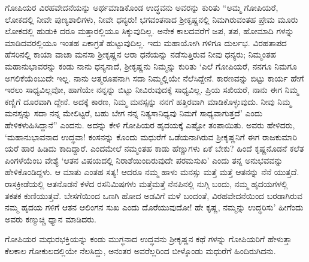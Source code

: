 ಗೋಪಿಯರ ವಿರಹವೇದನೆಯನ್ನು ಅರ್ಥಮಾಡಿಕೊಂಡ ಉದ್ಧವನು ಅವರನ್ನು ಕುರಿತು “ಅಮ್ಮ ಗೋಪಿಯರೆ, ಲೋಕದಲ್ಲಿ ನೀವೇ ಪುಣ್ಯಶಾಲಿಗಳು, ನೀವೇ ಧನ್ಯರು! ಭಗವಂತನಾದ ಶ್ರೀಕೃಷ್ಣನಲ್ಲಿ ನಿಮಗಿರುವಂತಹ ಪ್ರೇಮ ಮೂರು ಲೋಕದಲ್ಲಿ ಹುಡುಕಿ ದರೂ ಮತ್ತಾರಲ್ಲಿಯೂ ಸಿಕ್ಕುವುದಿಲ್ಲ. ಅನೇಕ ಕಾಲದವರೆಗೆ ಜಪ, ತಪ, ಹೋಮಾದಿ ಗಳನ್ನು ಮಾಡಿದವರಲ್ಲಿಯೂ ಇಂತಹ ಏಕಾಗ್ರತೆ ಹುಟ್ಟುವುದಿಲ್ಲ. ಇದು ಮಹಾಯೋಗಿ ಗಳಿಗೂ ದುರ್ಲಭ. ವಿರಹತಾಪದ ಹೆಸರಿನಲ್ಲಿ ಕಾಯಾ ವಾಚಾ ಮನಸಾ ಶ್ರೀಕೃಷ್ಣನ ಆರಾ ಧನೆಯನ್ನು ನಡೆಸುತ್ತಿರುವ ನೀವು ಧನ್ಯರು; ನಿಮ್ಮಂತಹ ಮಹಾನುಭಾವರನ್ನು ಕಂಡು ನಾನು ಧನ್ಯನಾದೆ, ಶ್ರೀಕೃಷ್ಣನು ನಿಮ್ಮನ್ನು ಕುರಿತು ‘ಎಲೆ ಗೋಪಿಯರೆ, ನನಗೂ ನಿಮಗೂ ಅಗಲಿಕೆಯೆಂಬುದೇ ಇಲ್ಲ. ನಾನು ಆತ್ಮರೂಪನಾಗಿ ಸದಾ ನಿಮ್ಮಲ್ಲಿಯೇ ನೆಲೆಸಿದ್ದೇನೆ. ಕಾರಣವನ್ನು ಬಿಟ್ಟು ಕಾರ್ಯ ಹೇಗೆ ಇರಲು ಸಾಧ್ಯವಿಲ್ಲವೋ, ಹಾಗೆಯೇ ನನ್ನನ್ನು ಬಿಟ್ಟು ನೀವಿರುವುದಕ್ಕೆ ಸಾಧ್ಯವಿಲ್ಲ. ಪ್ರಿಯ ಸಖಿಯರೆ, ನಾನು ಈಗ ನಿಮ್ಮ ಕಣ್ಣಿಗೆ ದೂರವಾಗಿ ದ್ದೇನೆ. ಅದಕ್ಕೆ ಕಾರಣ, ನಿಮ್ಮ ಮನಸ್ಸನ್ನು ನನಗೆ ಹತ್ತಿರವಾಗಿ ಮಾಡಿಕೊಳ್ಳುವುದು. ನೀವು ನಿಮ್ಮ ಮನಸ್ಸನ್ನು ಸದಾ ನನ್ನ ಮೇಲಿಟ್ಟರೆ, ಬಹು ಬೇಗ ನನ್ನ ನಿತ್ಯಸಾನಿಧ್ಯವು ನಿಮಗೆ ಸಾಧ್ಯವಾಗುತ್ತದೆ’ ಎಂದು ಹೇಳಿಕಳುಹಿಸಿದ್ದಾನೆ” ಎಂದನು. ಅದನ್ನು ಕೇಳಿ ಗೋಪಿಯರ ಹೃದಯಕ್ಕೆ ಎಷ್ಟೋ ತಂಪಾಯಿತು. ಅವರು ಹೇಳಿದರು, ‘ಮಹಾನುಭಾವನಾದ ಉದ್ಧವಾ! ಕಂಸನನ್ನು ಕೊಂದು ಮಧುರೆಗೆ ಒಡೆಯನಾಗಿರುವ ಶ್ರೀಕೃಷ್ಣನಿಗೆ ಈಗ ರಾಜಕುಮಾರಿ ಯರೆ ಹಾರ ಹಿಡಿದು ಕಾದಿದ್ದಾರೆ. ಎಂದಮೇಲೆ ನಮ್ಮಂತಹ ಕಾಡು ಹೆಣ್ಣುಗಳು ಏಕೆ ಬೇಕು? ಹಿಂದೆ ಕೃಷ್ಣನೊಡನೆ ಕಲೆತ ಪಿಂಗಳೆಯೆಂಬ ವೇಶ್ಯೆ ‘ಆತನ ವಿಷಯದಲ್ಲಿ ನಿರಾಶೆಯಿಂದಿರುವುದೇ ಪರಮಸುಖ’ ಎಂದು ತನ್ನ ಅನುಭವವನ್ನು ಹೇಳಿಕೊಂಡಿದ್ದಳು. ಆ ಮಾತು ಎಂತಹ ಸತ್ಯ! ಆದರೂ ನಮ್ಮ ಹಾಳು ಮನಸ್ಸು ಮತ್ತೆ ಮತ್ತೆ ಆತನನ್ನು ನೆನೆ ಯುತ್ತದೆ. ರಾಸಕ್ರೀಡೆಯಲ್ಲಿ ಆತನೊಡನೆ ಕಳೆದ ರಸನಿಮಿಷಗಳು ಮತ್ತೆಮತ್ತೆ ನೆನಪಿನಲ್ಲಿ ನುಗ್ಗಿ ಬಂದು, ನಮ್ಮ ಹೃದಯಗಳಲ್ಲಿ ತಕತಕ ಕುಣಿಯುತ್ತವೆ. ಬೇಸಗೆಯಿಂದ ಒಣಗಿ ಹೋದ ಅಡವಿಗೆ ಮಳೆ ಬಂದಂತೆ, ವಿರಹವೇದನೆಯಿಂದ ಬರಡಾಗಿರುವ ನಮ್ಮ ಹೃದಯ ಗಳಿಗೆ ಆತನ ಆಲಿಂಗನ ಸುಖ ಎಂದು ದೊರೆಯುವುದೋ! ಹೇ ಕೃಷ್ಣ, ನಮ್ಮನ್ನು ಉದ್ಧರಿಸು’ ಹೀಗೆಂದು ಅವರು ಕಣ್ಮುಚ್ಚಿ ಧ್ಯಾನ ಮಾಡಿದರು.

ಗೋಪಿಯರ ಮಧುರಭಕ್ತಿಯನ್ನು ಕಂಡು ಮುಗ್ಧನಾದ ಉದ್ಧವನು ಶ್ರೀಕೃಷ್ಣನ ಕಥೆ ಗಳನ್ನು ಗೋಪಿಯರಿಗೆ ಹೇಳುತ್ತಾ ಕೆಲಕಾಲ ಗೋಕುಲದಲ್ಲಿಯೇ ನೆಲಸಿದ್ದು, ಅನಂತರ ಅವರೆಲ್ಲರಿಂದ ಬೀಳ್ಕೊಂಡು ಮಧುರೆಗೆ ಹಿಂದಿರುಗಿದನು.

